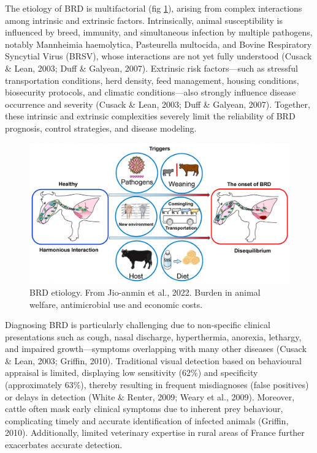The etiology of BRD is multifactorial (fig \ref{fig:chap1-BRDetiology}), arising from complex interactions among intrinsic and extrinsic factors. Intrinsically, animal susceptibility is influenced by breed, immunity, and simultaneous infection by multiple pathogens, notably Mannheimia haemolytica, Pasteurella multocida, and Bovine Respiratory Syncytial Virus (BRSV), whose interactions are not yet fully understood (Cusack \& Lean, 2003; Duff \& Galyean, 2007). Extrinsic risk factors—such as stressful transportation conditions, herd density, feed management, housing conditions, biosecurity protocols, and climatic conditions—also strongly influence disease occurrence and severity (Cusack \& Lean, 2003; Duff \& Galyean, 2007). Together, these intrinsic and extrinsic complexities severely limit the reliability of BRD prognosis, control strategies, and disease modeling.


\begin{figure}[h]
  \includegraphics[width=\linewidth]{figures/chap1/BRD etiology.png}
  \caption{BRD etiology. From Jio-anmin et al., 2022. Burden in animal welfare, antimicrobial use and economic costs.}
  \label{fig:chap1-BRDetiology}
\end{figure}

Diagnosing BRD is particularly challenging due to non-specific clinical presentations such as cough, nasal discharge, hyperthermia, anorexia, lethargy, and impaired growth—symptoms overlapping with many other diseases (Cusack \& Lean, 2003; Griffin, 2010). Traditional visual detection based on behavioural appraisal is limited, displaying low sensitivity (62\%) and specificity (approximately 63\%), thereby resulting in frequent misdiagnoses (false positives) or delays in detection (White \& Renter, 2009; Weary et al., 2009). Moreover, cattle often mask early clinical symptoms due to inherent prey behaviour, complicating timely and accurate identification of infected animals (Griffin, 2010). Additionally, limited veterinary expertise in rural areas of France further exacerbates accurate detection.

